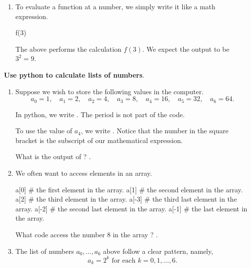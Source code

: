 \documentclass[../main.tex]{subfiles}
\begin{document}
\begin{enumerate}
    \faExclamationTriangle{} Notice there are four spaces within each line of the function definition. These spaces are \emph{required} to tell Python that we are \emph{inside} the definition of a function. 

  \item To evaluate a function at a number, we simply write it like a math expression.
    \begin{pythoncode}
f(3)
    \end{pythoncode}
    The above performs the calculation \(f(3)\). We expect the output to be \(3^{2} = 9\).

\end{enumerate}

\textbf{Use python to calculate lists of numbers}.
\begin{enumerate}
  \item Suppose we wish to store the following values in the computer. 
    \[
      a_{0} = 1, \quad a_{1} = 2, \quad a_{2} = 4, \quad  a_{3} = 8, \quad a_{4} = 16, \quad a_{5} = 32, \quad a_{6} = 64.
    \]

    In python, we write .  The period is not part of the code.

    To use the value of \(a_{4}\), we write .  Notice that the number in the square bracket is the subscript of our mathematical expression.

    \faComment{} What is the output of ? \underline{\hspace{2in}}.

  \item We often want to access elements in an array.  
    \begin{pythoncode}
a[0]    # the first element in the array.
a[1]    # the second element in the array.
a[2]    # the third element in the array.
a[-3]   # the third last element in the array. 
a[-2]   # the second last element in the array. 
a[-1]   # the last element in the array.
    \end{pythoncode}

    \faComment{} What code access the number \(8\) in the array ? \underline{\hspace{1in}}.

  \item The list of numbers \(a_{0}, \ldots, a_{6}\) above follow a clear pattern, namely, 
    \[
      a_{k} = 2^{k} \text{ for each } k = 0, 1, \ldots, 6.
    \]


\end{enumerate}
\end{document}

